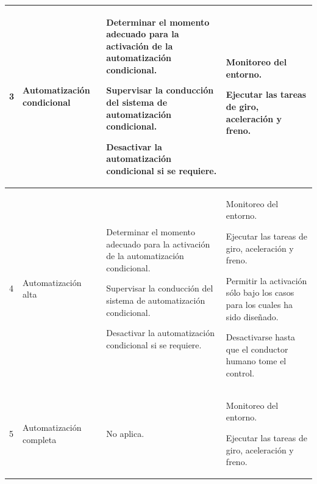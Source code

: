 \begin{center}
\begin{longtable}{|p{1cm}|p{3.5cm}|p{5.5cm}|p{5.5cm}|}
		3 & Automatización condicional & \begin{compactitem}
			\item Determinar el momento adecuado para la activación de la automatización condicional.
			\item Supervisar la conducción del sistema de automatización condicional.
			\item Desactivar la automatización condicional si se requiere.
		\end{compactitem} & \begin{compactitem}
			\item Monitoreo del entorno.
			\item Ejecutar las tareas de giro, aceleración y freno.
		\end{compactitem}\\
			\hline
		4 & Automatización alta & \begin{compactitem}
			\item Determinar el momento adecuado para la activación de la automatización condicional.
			\item Supervisar la conducción del sistema de automatización condicional.
			\item Desactivar la automatización condicional si se requiere.
		\end{compactitem} & \begin{compactitem}
			\item Monitoreo del entorno.
			\item Ejecutar las tareas de giro, aceleración y freno.
			\item Permitir la activación sólo bajo los casos para los cuales ha sido diseñado.
			\item Desactivarse hasta que el conductor humano tome el control.
		\end{compactitem}\\
			\hline
		5 & Automatización completa & \begin{compactitem}
			\item No aplica.
		\end{compactitem} & \begin{compactitem}
			\item Monitoreo del entorno.
			\item Ejecutar las tareas de giro, aceleración y freno.
		\end{compactitem}\\
			\hline
		\end{longtable}
	\end{center}
